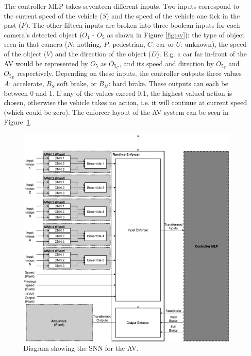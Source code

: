 The controller \ac{MLP} takes seventeen different inputs. 
Two inputs correspond to the current speed of the vehicle ($S$) and the speed of the vehicle one tick in the past ($P$). 
The other fifteen inputs are broken into three boolean inputs for each camera's detected object ($O_1$ - $O_5$ as shown in Figure \ref{fig:av}): the type of object seen in that camera ($N$: nothing, $P$: pedestrian, $C$: car or $U$: unknown), the speed of the object ($V$) and the direction of the object ($D$).
E.g. a car far in-front of the \ac{AV} would be represented by $O_5$ as $O_{5_C}$, and its speed and direction by $O_{5_V}$ and $O_{5_D}$ respectively.
Depending on these inputs, the controller outputs three values  $A$: accelerate, $B_S$ soft brake, or $B_H$: hard brake.
These outputs can each be between 0 and 1.
If any of the values exceed 0.1, the highest valued action is chosen, otherwise the vehicle takes no action, i.e. it will continue at current speed (which could be zero).
The enforcer layout of the \ac{AV} system can be seen in Figure~\ref{fig:avmnn}.

\begin{figure}[H]
	\centering
	\includegraphics[width=\textwidth]{Content/fig/AV-MNN.pdf}
	\caption{Diagram showing the \ac{SNN} for the \ac{AV}. \label{fig:avmnn}}
\end{figure}


